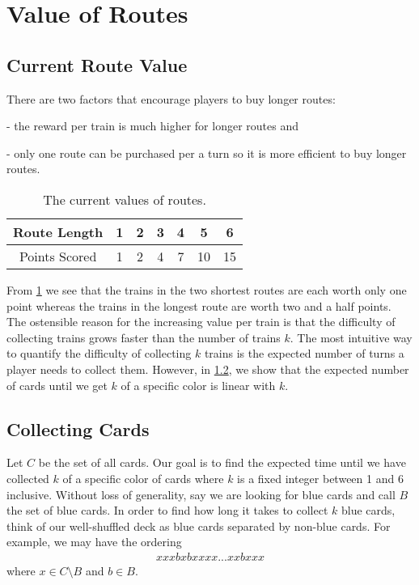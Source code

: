 \section{Value of Routes}
\subsection{Current Route Value}
There are two factors that encourage players to buy longer routes:

- the reward per train is much higher for longer routes and

- only one route can be purchased per a turn so it is more efficient
to buy longer routes.

\begin{table}[h!]
\renewcommand{\arraystretch}{1.5}
\centering
\begin{tabular}{| c | c | c | c | c | c | c |}
\hline
 Route Length & 1 & 2 & 3 & 4 & 5 & 6\\
 \hline
 Points Scored & 1 & 2 & 4 & 7 & 10 & 15\\
 \hline
\end{tabular}
\caption{The current values of routes.}
\label{table:current_value}
\end{table}
From \cref{table:current_value} we see that 
the trains in the two shortest routes are each worth only one point
whereas the trains in the longest route are worth two and a half points.
The ostensible reason for the increasing value per train is that the
difficulty of collecting trains grows faster than the number of trains $k$.
The most intuitive way to quantify the difficulty of collecting $k$ trains
is the expected number of turns a player needs to collect them.
However, in \cref{sec:collecting_cards}, 
we show that the expected number of cards
until we get $k$ of a specific color is linear with $k$.

\subsection{Collecting Cards}\label{sec:collecting_cards}
Let $C$ be the set of all cards.
Our goal is to find the expected time until
we have collected $k$ of a specific
color of cards where $k$ is a fixed
integer between 1 and 6 inclusive.
Without loss of generality, say we are
looking for blue cards and
call $B$ the set of blue cards.
In order to find how long it takes to collect $k$ blue cards,
think of our well-shuffled deck as
blue cards separated by non-blue cards.
For example, we may have the ordering
\begin{align}
    xxxbxbxxxx...xxbxxx \nonumber
\end{align}
where $x \in C \setminus B$ and $b \in B$.

